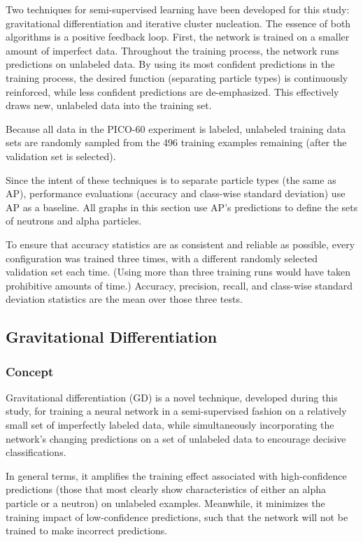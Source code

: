 \documentclass[10pt]{article}
\begin{document}
Two techniques for semi-supervised learning have been developed for this study: gravitational differentiation and iterative cluster nucleation. The essence of both algorithms is a positive feedback loop. First, the network is trained on a smaller amount of imperfect data. Throughout the training process, the network runs predictions on unlabeled data. By using its most confident predictions in the training process, the desired function (separating particle types) is continuously reinforced, while less confident predictions are de-emphasized. This effectively draws new, unlabeled data into the training set.

Because all data in the PICO-60 experiment is labeled, unlabeled training data sets are randomly sampled from the 496 training examples remaining (after the validation set is selected).

Since the intent of these techniques is to separate particle types (the same as AP), performance evaluations (accuracy and class-wise standard deviation) use AP as a baseline. All graphs in this section use AP's predictions to define the sets of neutrons and alpha particles.

To ensure that accuracy statistics are as consistent and reliable as possible, every configuration was trained three times, with a different randomly selected validation set each time. (Using more than three training runs would have taken prohibitive amounts of time.) Accuracy, precision, recall, and class-wise standard deviation statistics are the mean over those three tests.

\subsection{Gravitational Differentiation}

\subsubsection{Concept}

Gravitational differentiation (GD) is a novel technique, developed during this study, for training a neural network in a semi-supervised fashion on a relatively small set of imperfectly labeled data, while simultaneously incorporating the network's changing predictions on a set of unlabeled data to encourage decisive classifications.

In general terms, it amplifies the training effect associated with high-confidence predictions (those that most clearly show characteristics of either an alpha particle or a neutron) on unlabeled examples. Meanwhile, it minimizes the training impact of low-confidence predictions, such that the network will not be trained to make incorrect predictions.
\end{document}
